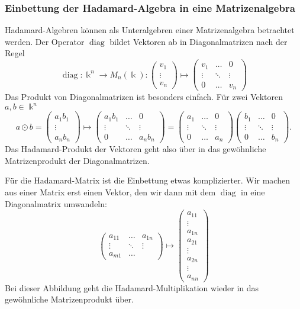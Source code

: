 \subsubsection{Einbettung der Hadamard-Algebra in eine Matrizenalgebra}
Hadamard-Algebren können als Unteralgebren einer Matrizenalgebra
betrachtet werden.
Der Operator $\operatorname{diag}$ bildet Vektoren ab in Diagonalmatrizen
nach der Regel
\[
\operatorname{diag}
\colon
\Bbbk^n \to M_n(\Bbbk)
:
\begin{pmatrix}
v_1\\
\vdots\\
v_n
\end{pmatrix}
\mapsto
\begin{pmatrix}
v_1&\dots&0\\
\vdots&\ddots&\vdots\\
0&\dots&v_n
\end{pmatrix}
\]
Das Produkt von Diagonalmatrizen ist besonders einfach.
Für zwei Vektoren $a,b\in\Bbbk^n$ 
\[
a\odot b
=
\begin{pmatrix}
a_1b_1\\
\vdots\\
a_nb_n
\end{pmatrix}
\mapsto
\begin{pmatrix}
a_1b_1&\dots&0\\
\vdots&\ddots&\vdots\\
0&\dots&a_nb_n
\end{pmatrix}
=
\begin{pmatrix}
a_1&\dots&0\\
\vdots&\ddots&\vdots\\
0&\dots&a_n
\end{pmatrix}
\begin{pmatrix}
b_1&\dots&0\\
\vdots&\ddots&\vdots\\
0&\dots&b_n
\end{pmatrix}.
\]
Das Hadamard-Produkt der Vektoren geht also über in das gewöhnliche
Matrizenprodukt der Diagonalmatrizen.

Für die Hadamard-Matrix ist die Einbettung etwas komplizierter.
Wir machen aus einer Matrix erst einen Vektor, den wir dann mit
dem $\operatorname{diag}$ in eine Diagonalmatrix umwandeln:
\[
\begin{pmatrix}
a_{11}&\dots&a_{1n}\\
\vdots&\ddots&\vdots\\
a_{m1}&\dots
\end{pmatrix}
\mapsto
\begin{pmatrix}
a_{11}\\
\vdots\\
a_{1n}\\
a_{21}\\
\vdots\\
a_{2n}\\
\vdots\\
a_{nn}
\end{pmatrix}
\]
Bei dieser Abbildung geht die Hadamard-Multiplikation wieder in
das gewöhnliche Matrizenprodukt über.

